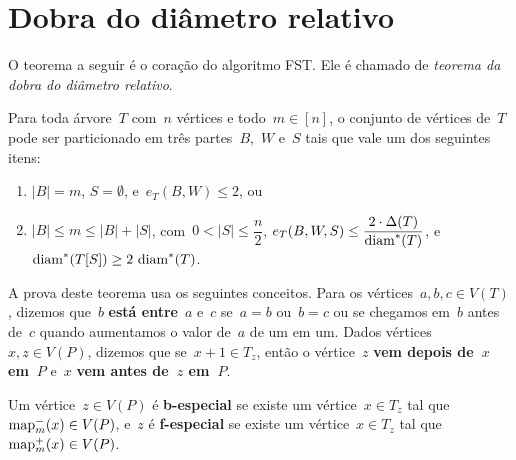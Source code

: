 \section {Dobra do diâmetro relativo}
\label{sec:dobraDiametro}
	O teorema a seguir é o coração do algoritmo FST.
	Ele é chamado de \textit{teorema da dobra do diâmetro relativo}.	



		\begin{teo}
		\label{teo:dobraDiametro}
			Para toda árvore~$T$ com~$n$ vértices e 
			todo~${m\in [n]}$,
			o conjunto de vértices de~$T$ pode ser particionado em 
			três partes~$B$,~$W$ e~$S$ tais que vale um dos 
			seguintes itens:
			\begin{enumerate}
				\item ${|B|=m}$, ${S=\emptyset}$, e~${e_T(B,W)\le 2}$, ou
				\item ${|B|\le m\le |B|+|S|}$, 
				com~${0<|S|\le\dfrac{n}{2}}$,
				${e_T(B,W,S)\le \dfrac{2\cdot 
				\Delta(T)}{\mathrm{diam}^*(T)}}$, 
				e~${\mathrm{diam}^*(T[S])\ge 2\ \mathrm{diam}^*(T)}$.
			\end{enumerate}
		\end{teo}

	\bigskip
	\bigskip
	
	A prova deste teorema usa os seguintes conceitos.
	Para os vértices~${a,b,c\in V(T)}$, dizemos que~$b$
	\textbf{está entre}~$a$ e~$c$ se~${a=b}$ ou~${b=c}$ 
	ou se chegamos em~$b$ antes
	de~$c$ quando aumentamos o valor de~$a$  
	de um em um.
	Dados vértices~${x,z\in V(P)}$, dizemos que 
	se~${x+1\in T_z}$, então o
	vértice~$z$ \textbf{vem depois de~$x$ em~$P$} 
	e~$x$ \textbf{vem antes de~$z$ em~$P$}.


	Um vértice~${z\in V(P)}$ é \textbf{b-especial}
	se existe um vértice~${x\in T_z}$ tal 
	que~${\mathrm{map}^{-}_m(x)\in V(P)}$, e~$z$ é
	\textbf{f-especial} se existe um vértice~${x\in T_z}$
	tal que~${\mathrm{map}^{+}_m(x)\in V(P)}$.

	\bigskip
	\bigskip



